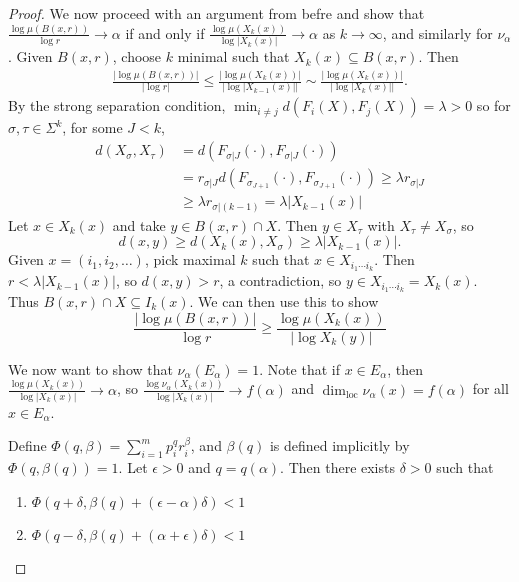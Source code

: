\documentclass[11pt, a4paper]{memoir}
\theoremstyle{change}
\theoremstyle{plain}
\theoremstyle{nonumberplain}
\newtheorem{proof}{Proof}
\DeclareMathOperator{\loc}{loc}
\numberwithin{equation}{section}
\begin{document}
\begin{proof}
    We now proceed with an argument from befre and show that $\frac{\log\mu(B(x,r))}{\log r}\to \alpha$ if and only if $\frac{\log\mu(X_k(x))}{\log|X_k(x)|}\to\alpha$ as $k\to\infty$, and similarly for $\nu_\alpha$.
    Given $B(x,r)$, choose $k$ minimal such that $X_k(x)\subseteq B(x,r)$.
    Then
    \begin{align*}
        \frac{|\log\mu(B(x,r))|}{|\log r|}\leq\frac{|\log \mu(X_k(x))|}{|\log|X_{k-1}(x)||}\sim\frac{|\log\mu(X_k(x))|}{|\log|X_k(x)||}.
    \end{align*}
    By the strong separation condition, $\min_{i\neq j}d(F_i(X),F_j(X))=\lambda>0$ so for $\sigma,\tau\in\Sigma^k$, for some $J<k$,
    \begin{align*}
        d(X_\sigma,X_\tau)  &= d(F_{\sigma|J}(\cdot),F_{\sigma|J}(\cdot))\\
                            &= r_{\sigma|J}d(F_{\sigma_{J+1}}(\cdot),F_{\sigma_{J+1}}(\cdot))\geq\lambda r_{\sigma|J}\\
                            &\geq \lambda r_{\sigma|(k-1)}=\lambda|X_{k-1}(x)|
    \end{align*}
    Let $x\in X_k(x)$ and take $y\in B(x,r)\cap X$.
    Then $y\in X_{\tau}$ with $X_\tau\neq X_\sigma$, so
    \begin{equation*}
        d(x,y)\geq d(X_k(x),X_\sigma)\geq\lambda|X_{k-1}(x)|.
    \end{equation*}
    Given $x=(i_1,i_2,\ldots)$, pick maximal $k$ such that $x\in X_{i_1\cdots i_k}$.
    Then $r<\lambda|X_{k-1}(x)|$, so $d(x,y)>r$, a contradiction, so $y\in X_{i_1\cdots i_k}=X_k(x)$.
    Thus $B(x,r)\cap X\subseteq I_k(x)$.
    We can then use this to show
    \begin{equation*}
        \frac{|\log\mu(B(x,r))|}{\log r}\geq\frac{\log\mu(X_k(x))}{|\log X_k(y)|}
    \end{equation*}

    We now want to show that $\nu_\alpha(E_\alpha)=1$.
    Note that if $x\in E_\alpha$, then $\frac{\log\mu(X_k(x))}{\log|X_k(x)|}\to\alpha$, so $\frac{\log\nu_\alpha(X_k(x))}{\log|X_k(x)|}\to f(\alpha)$ and $\dim_{\loc}\nu_\alpha(x)=f(\alpha)$ for all $x\in E_\alpha$.

    Define $\Phi(q,\beta)=\sum_{i=1}^m p_i^qr_i^\beta$, and $\beta(q)$ is defined implicitly by $\Phi(q,\beta(q))=1$.
    Let $\epsilon>0$ and $q=q(\alpha)$.
    Then there exists $\delta>0$ such that
    \begin{enumerate}[nl,r]
        \item $\Phi(q+\delta,\beta(q)+(\epsilon-\alpha)\delta)<1$
        \item $\Phi(q-\delta,\beta(q)+(\alpha+\epsilon)\delta)<1$
    \end{enumerate}


\end{proof}
\end{document}
